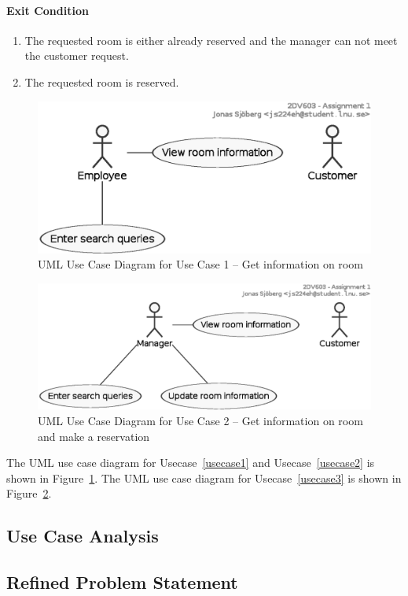 \paragraph{Exit Condition}

\begin{enumerate}
\def\labelenumi{\arabic{enumi}.}
\tightlist
\item
  The requested room is either already reserved and the manager can not
  meet the customer request.
\item
  The requested room is reserved.
\end{enumerate}




\begin{figure}[htbp]
  \centering
  \includegraphics[width=\linewidth]{include/usecase1.eps}
  \caption{UML Use Case Diagram for Use Case 1 -- Get information on room}
  \label{fig:uml-usecase1}
\end{figure}

\begin{figure}[htbp]
  \centering
  \includegraphics[width=\linewidth]{include/usecase2.eps}
  \caption{UML Use Case Diagram for Use Case 2 -- Get information on room and make a reservation}
  \label{fig:uml-usecase2}
\end{figure}


The UML use case diagram for Usecase~\ref{usecase1} and Usecase~\ref{usecase2} is shown in Figure~\ref{fig:uml-usecase1}.
The UML use case diagram for Usecase~\ref{usecase3} is shown in Figure~\ref{fig:uml-usecase2}.


\subsection{Use Case Analysis}
%
%


\subsection{Refined Problem Statement}
%
%
